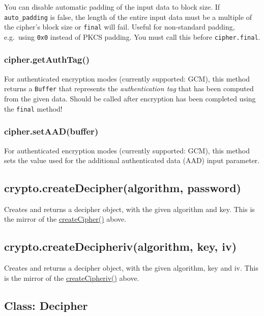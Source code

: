 You can disable automatic padding of the input data to block size. If
\texttt{auto\_padding} is false, the length of the entire input data
must be a multiple of the cipher's block size or \texttt{final} will
fail. Useful for non-standard padding, e.g.~using \texttt{0x0} instead
of PKCS padding. You must call this before \texttt{cipher.final}.

\subsubsection{cipher.getAuthTag()}\label{cipher.getauthtag}

For authenticated encryption modes (currently supported: GCM), this
method returns a \texttt{Buffer} that represents the
\emph{authentication tag} that has been computed from the given data.
Should be called after encryption has been completed using the
\texttt{final} method!

\subsubsection{cipher.setAAD(buffer)}\label{cipher.setaadbuffer}

For authenticated encryption modes (currently supported: GCM), this
method sets the value used for the additional authenticated data (AAD)
input parameter.

\subsection{crypto.createDecipher(algorithm,
password)}\label{crypto.createdecipheralgorithm-password}

Creates and returns a decipher object, with the given algorithm and key.
This is the mirror of the
\hyperref[cryptoux5fcryptoux5fcreatecipherux5falgorithmux5fpassword]{createCipher()}
above.

\subsection{crypto.createDecipheriv(algorithm, key,
iv)}\label{crypto.createdecipherivalgorithm-key-iv}

Creates and returns a decipher object, with the given algorithm, key and
iv. This is the mirror of the
\hyperref[cryptoux5fcryptoux5fcreatecipherivux5falgorithmux5fkeyux5fiv]{createCipheriv()}
above.

\subsection{Class: Decipher}\label{class-decipher}

